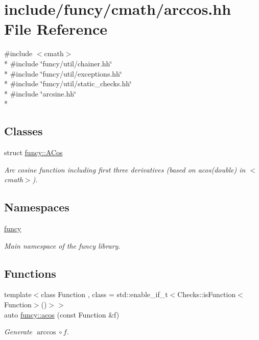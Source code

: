 \hypertarget{arccos_8hh}{\section{include/funcy/cmath/arccos.hh File Reference}
\label{arccos_8hh}
}
{\ttfamily \#include $<$cmath$>$}\\*
{\ttfamily \#include \char`\"{}funcy/util/chainer.\-hh\char`\"{}}\\*
{\ttfamily \#include \char`\"{}funcy/util/exceptions.\-hh\char`\"{}}\\*
{\ttfamily \#include \char`\"{}funcy/util/static\-\_\-checks.\-hh\char`\"{}}\\*
{\ttfamily \#include \char`\"{}arcsine.\-hh\char`\"{}}\\*
\subsection*{Classes}
\begin{DoxyCompactItemize}
\item 
struct \hyperlink{structfuncy_1_1ACos}{funcy\-::\-A\-Cos}
\begin{DoxyCompactList}\small\item\em Arc cosine function including first three derivatives (based on acos(double) in $<$cmath$>$). \end{DoxyCompactList}\end{DoxyCompactItemize}
\subsection*{Namespaces}
\begin{DoxyCompactItemize}
\item 
\hyperlink{namespacefuncy}{funcy}
\begin{DoxyCompactList}\small\item\em Main namespace of the funcy library. \end{DoxyCompactList}\end{DoxyCompactItemize}
\subsection*{Functions}
\begin{DoxyCompactItemize}
\item 
{\footnotesize template$<$class Function , class  = std\-::enable\-\_\-if\-\_\-t$<$\-Checks\-::is\-Function$<$\-Function$>$()$>$$>$ }\\auto \hyperlink{group__CMathGroup_ga440738f86b6ddd1e240a21e8712ebc55}{funcy\-::acos} (const Function \&f)
\begin{DoxyCompactList}\small\item\em Generate $ \arccos\circ f $. \end{DoxyCompactList}\end{DoxyCompactItemize}
